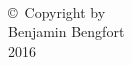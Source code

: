 
\thispagestyle{empty}
\hbox{\ }

\vfill
\renewcommand{\baselinestretch}{1}
\small\normalsize

\vspace{-.65in}

\begin{center}
\large{\copyright \hbox{ }Copyright by\\
Benjamin Bengfort  %
\\
2016}
\end{center}

\vfill
